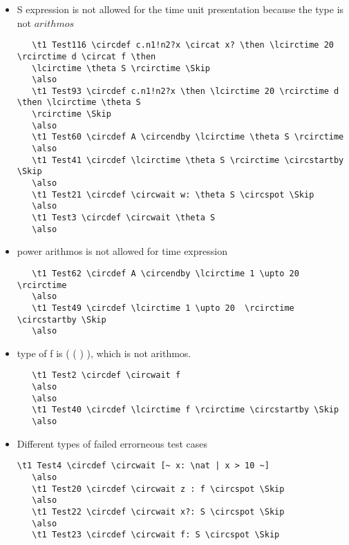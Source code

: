 \documentclass{article}
\begin{document}
\begin{itemize}
\item \theta S expression is not allowed for the time unit presentation because the type is not $arithmos$

\begin{verbatim}
   \t1 Test116 \circdef c.n1!n2?x \circat x? \then \lcirctime 20 \rcirctime d \circat f \then    
   \lcirctime \theta S \rcirctime \Skip 
   \also
   \t1 Test93 \circdef c.n1!n2?x \then \lcirctime 20 \rcirctime d \then \lcirctime \theta S 
   \rcirctime \Skip 
   \also
   \t1 Test60 \circdef A \circendby \lcirctime \theta S \rcirctime 
   \also
   \t1 Test41 \circdef \lcirctime \theta S \rcirctime \circstartby \Skip
   \also
   \t1 Test21 \circdef \circwait w: \theta S \circspot \Skip
   \also
   \t1 Test3 \circdef \circwait \theta S 
   \also
\end{verbatim}

\item  power arithmos is not allowed for time expression

\begin{verbatim}
   \t1 Test62 \circdef A \circendby \lcirctime 1 \upto 20 \rcirctime 
   \also
   \t1 Test49 \circdef \lcirctime 1 \upto 20  \rcirctime \circstartby \Skip
   \also
\end{verbatim}

\item type of f is \power ( \arithmos \cross ( \arithmos \cross \arithmos ) ), which is not arithmos. 
    
\begin{verbatim}
   \t1 Test2 \circdef \circwait f 
   \also
   \also
   \t1 Test40 \circdef \lcirctime f \rcirctime \circstartby \Skip
   \also
\end{verbatim}

\item Different types of failed errorneous  test cases 

\begin{verbatim}
\t1 Test4 \circdef \circwait [~ x: \nat | x > 10 ~] 
   \also
   \t1 Test20 \circdef \circwait z : f \circspot \Skip
   \also
   \t1 Test22 \circdef \circwait x?: S \circspot \Skip
   \also
   \t1 Test23 \circdef \circwait f: S \circspot \Skip 
\end{verbatim}
\end{itemize}
\end{document}
